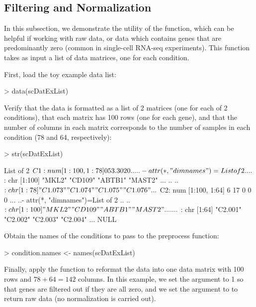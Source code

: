 \documentclass{article}
\begin{document}
\subsection{Filtering and Normalization}

In this subsection, we demonstrate the utility of the  function, which can be helpful if working with raw data, or data which contains genes that are predominantly zero (common in single-cell RNA-seq experiments).  This function takes as input a list of data matrices, one for each condition.

First, load the toy example data list:
\begin{Schunk}
\begin{Sinput}
> data(scDatExList)
\end{Sinput}
\end{Schunk}

Verify that the data is formatted as a list of 2 matrices (one for each of 2 conditions), that each matrix has 100 rows (one for each gene), and that the number of columns in each matrix corresponds to the number of samples in each condition (78 and 64, respectively):
\begin{Schunk}
\begin{Sinput}
> str(scDatExList)
\end{Sinput}
\begin{Soutput}
List of 2
 $ C1: num [1:100, 1:78] 0 53.3 0 2 0 ...
  ..- attr(*, "dimnames")=List of 2
  .. ..$ : chr [1:100] "MKL2" "CD109" "ABTB1" "MAST2" ...
  .. ..$ : chr [1:78] "C1.073" "C1.074" "C1.075" "C1.076" ...
 $ C2: num [1:100, 1:64] 6 17 0 0 0 ...
  ..- attr(*, "dimnames")=List of 2
  .. ..$ : chr [1:100] "MKL2" "CD109" "ABTB1" "MAST2" ...
  .. ..$ : chr [1:64] "C2.001" "C2.002" "C2.003" "C2.004" ...
NULL
\end{Soutput}
\end{Schunk}

Obtain the names of the conditions to pass to the preprocess function:
\begin{Schunk}
\begin{Sinput}
> condition.names <- names(scDatExList)
\end{Sinput}
\end{Schunk}

Finally, apply the  function to reformat the data into one data matrix with 100 rows and $78+64=142$ columns.  In this example, we set the  argument to 1 so that genes are filtered out if they are all zero, and we set the  argument to  to return raw data (no normalization is carried out).
\end{document}

